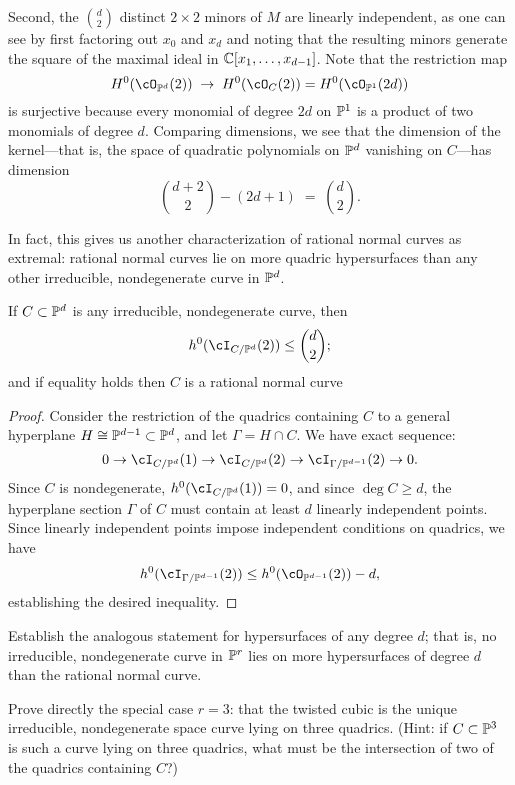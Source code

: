 Second, the ${d\choose 2}$ distinct $2\times 2$ minors of $M$ are linearly independent, as one can see by first factoring out $x_0$ and $x_d$ and noting that the resulting minors generate the square of the maximal ideal in $\CC[x_1,\dots, x_{d-1}]$. Note that
the restriction map
$$
H^0(\cO_{\PP^d}(2)) \; \to \; H^0(\cO_{C}(2)) = H^0(\cO_{\PP^1}(2d))
$$
 is surjective  because every monomial of degree $2d$ on $\PP^1$ is a product of two monomials of degree $d$. Comparing dimensions, we see that the dimension of the kernel---that is, the space of quadratic polynomials on $\PP^d$ vanishing on $C$---has dimension
$$
\binom{d+2}{2} - (2d+1) \; = \; \binom{d}{2}.
$$


In fact, this gives us another characterization of rational normal curves as extremal: rational normal curves lie on more quadric hypersurfaces than any other irreducible, nondegenerate curve in $\PP^d$.

\begin{proposition}
If $C \subset \PP^d$ is any irreducible, nondegenerate curve, then
$$
h^0(\cI_{C/\PP^d}(2)) \leq  \binom{d}{2};
$$
and if equality holds then $C$ is a rational normal curve
\end{proposition}

\begin{proof}
Consider the restriction of the quadrics containing $C$ to a general hyperplane $H \cong \PP^{d-1} \subset \PP^d$, and let $\Gamma = H \cap C$. We have exact sequence:
$$
0 \to \cI_{C/\PP^d}(1) \to \cI_{C/\PP^d}(2) \to \cI_{\Gamma/\PP^{d-1}}(2) \to 0.
$$ 
Since $C$ is nondegenerate, $h^0(\cI_{C/\PP^d}(1)) = 0$, and since $\deg C \geq d$, the hyperplane section $\Gamma$ of $C$ must contain at least $d$ linearly independent points. Since linearly independent points impose independent conditions on quadrics, we have
$$
h^0(\cI_{\Gamma/\PP^{d-1}}(2)) \leq h^0(\cO_{\PP^{d-1}}(2)) - d,
$$
establishing the desired inequality.
\end{proof}

\begin{exercise}
Establish the analogous statement for hypersurfaces of any degree $d$; that is, no irreducible, nondegenerate curve in $\PP^r$ lies on more hypersurfaces of degree $d$ than the rational normal curve.
\end{exercise}

\begin{exercise}
Prove directly  the special case $r=3$: that the twisted cubic is the unique irreducible, nondegenerate space curve lying on three quadrics. (Hint: if $C \subset \PP^3$ is such a curve lying on three quadrics, what must be the intersection of two of the quadrics containing $C$?)
\end{exercise}

